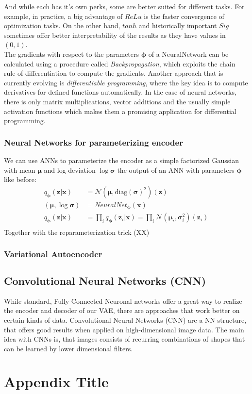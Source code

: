 \documentclass[12pt]{report}
\theoremstyle{definition}
\begin{document}
And while each has it's own perks, some are better suited for different tasks. For example, in practice, a big advantage of $ReLu$ is the faster convergence of optimization tasks. On the other hand, $tanh$ and historically important $Sig$ sometimes offer better interpretability of the results as they have values in $(0, 1)$. \\
The gradients with respect to the parameters $\pmb{\phi}$ of a NeuralNetwork can be calculated using a procedure called \emph{Backpropagation}, which exploits the chain rule of differentiation to compute the gradients. Another approach that is currently evolving is \emph{differentiable programming}, where the key idea is to compute derivatives for defined functions automatically. In the case of neural networks, there is only matrix multiplications, vector additions and the usually simple activation functions which makes them a promising application for differential programming. 

\subsection{Neural Networks for parameterizing encoder}
We can use ANNs to parameterize the encoder as a simple factorized Gaussian with mean $\pmb{\mu}$ and log-deviation $\log \pmb{\sigma}$ the output of an ANN with parameters $\pmb{\phi}$ like before:
\begin{equation}
\begin{split}
q_{\pmb{\phi}}(\mathbf{z}|\mathbf{x}) & = \mathcal{N}(\pmb{\mu}, \mathrm{diag}(\pmb{\sigma})^2)(\mathbf{z}) \\
(\pmb{\mu}, \log \pmb{\sigma}) & = NeuralNet_{\pmb{\phi}}(\mathbf{x}) \\
q_{\pmb{\phi}}(\mathbf{z}|\mathbf{x}) & = \prod_i q_{\pmb{\phi}}(\mathbf{z}_i|\mathbf{x}) = \prod_i \mathcal{N}(\pmb{\mu}_i, \pmb{\sigma}_i^2)(\mathbf{z}_i)\\
\end{split}
\end{equation}
Together with the reparameterization trick (XX) %

\subsection{Variational Autoencoder }


\section{Convolutional Neural Networks (CNN)}
While standard, Fully Connected Neuronal networks offer a great way to realize the encoder and decoder of our VAE, there are approaches that work better on certain kinds of data. Convolutional Neural Networks (CNN) are a NN structure, that offers good results when applied on high-dimensional image data. The main idea with CNNs is, that images consists of recurring combinations of shapes that can be learned by lower dimensional filters. %

\appendix
\chapter{Appendix Title}
%
\end{document}
